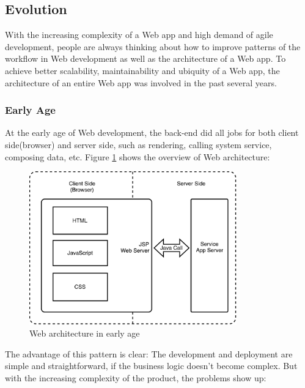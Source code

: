 

\subsection{Evolution}
With the increasing complexity of a Web app and high demand of agile development, people are always thinking about how to improve patterns of the workflow in Web development as well as the architecture of a Web app. To achieve better scalability, maintainability and ubiquity of a Web app, the architecture of an entire Web app was involved in the past several years.

\subsubsection{Early Age}
At the early age of Web development, the back-end did all jobs for both client side(browser) and server side, such as rendering, calling system service, composing data, etc. Figure \ref{fig:3.1} shows the overview of Web architecture:
\begin{figure}[!htbp]
  \centering
    \includegraphics[width=0.8\textwidth]{Figures/tech-Web-arch-early.pdf}
  \caption{Web architecture in early age}
  \label{fig:3.1}
\end{figure}
The advantage of this pattern is clear: The development and deployment are simple and straightforward, if the business logic doesn't become complex. But with the increasing complexity of the product, the problems show up:
